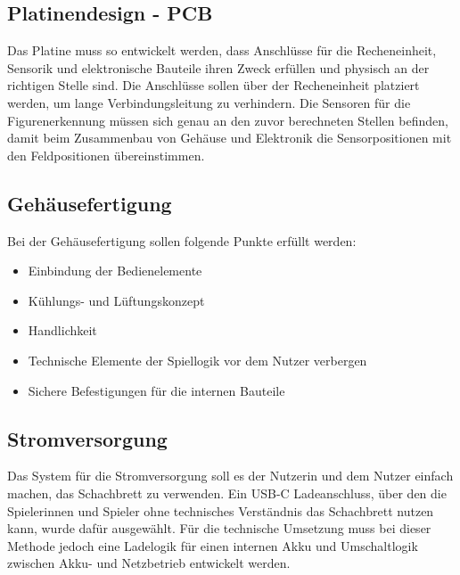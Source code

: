 \subsection{Platinendesign - PCB}

Das Platine muss so entwickelt werden, dass Anschlüsse für die Recheneinheit, Sensorik und elektronische Bauteile ihren Zweck erfüllen und physisch an der richtigen Stelle sind. Die Anschlüsse sollen über der Recheneinheit platziert werden, um lange Verbindungsleitung zu verhindern. Die Sensoren für die Figurenerkennung müssen sich genau an den zuvor berechneten Stellen befinden, damit beim Zusammenbau von Gehäuse und Elektronik die Sensorpositionen mit den Feldpositionen übereinstimmen. 

\subsection{Gehäusefertigung}

Bei der Gehäusefertigung sollen folgende Punkte erfüllt werden:
\begin{itemize}
\item Einbindung der Bedienelemente
\item Kühlungs- und Lüftungskonzept
\item Handlichkeit 
\item Technische Elemente der Spiellogik vor dem Nutzer verbergen
\item Sichere Befestigungen für die internen Bauteile
\end{itemize}

\subsection{Stromversorgung}

Das System für die Stromversorgung soll es der Nutzerin und dem Nutzer einfach machen, das Schachbrett zu verwenden. Ein USB-C Ladeanschluss, über den die Spielerinnen und Spieler ohne technisches Verständnis das Schachbrett nutzen kann, wurde dafür ausgewählt. Für die technische Umsetzung muss bei dieser Methode jedoch eine Ladelogik für einen internen Akku und Umschaltlogik zwischen Akku- und Netzbetrieb entwickelt werden. 